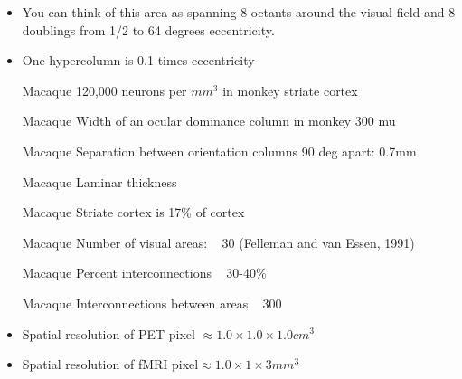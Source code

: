 \begin{itemize}
\item You can think of this area as spanning 8 octants around the visual
field and 8 doublings from 1/2 to 64 degrees eccentricity.

\item One hypercolumn is 0.1 times eccentricity 

\item [Macaque] 120,000 neurons per ${mm}^3$ in monkey striate cortex

\item [Macaque] Width of an ocular dominance column in monkey 300 mu

\item [Macaque] Separation between orientation columns 90 deg apart: 0.7mm

\item [Macaque] Laminar thickness %

\item [Macaque] Striate cortex is 17\% of cortex %

\item [Macaque] Number of visual areas:  ~ 30  (Felleman and van
Essen, 1991)

\item [Macaque] Percent interconnections ~ 30-40\%

\item [Macaque] Interconnections between areas ~ 300

\item Spatial resolution of PET pixel $\approx 1.0 \times 1.0 \times 1.0 cm^3$

\item Spatial resolution of fMRI pixel$\approx 1.0 \times 1 \times 3  mm^3$

\end{itemize}
